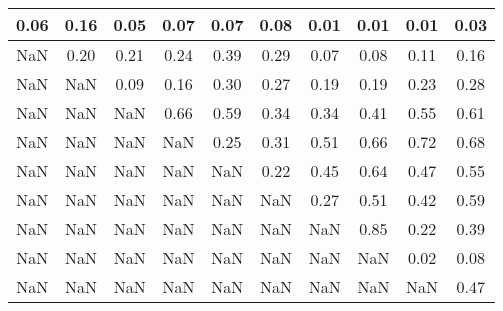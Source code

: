 \begin{tabular}{|c|c|c|c|c|c|c|c|c|c|}
\hline
0.06&0.16&0.05&0.07&0.07&0.08&0.01&0.01&0.01&0.03\\\hline
NaN&0.20&0.21&0.24&0.39&0.29&0.07&0.08&0.11&0.16\\\hline
NaN&NaN&0.09&0.16&0.30&0.27&0.19&0.19&0.23&0.28\\\hline
NaN&NaN&NaN&0.66&0.59&0.34&0.34&0.41&0.55&0.61\\\hline
NaN&NaN&NaN&NaN&0.25&0.31&0.51&0.66&0.72&0.68\\\hline
NaN&NaN&NaN&NaN&NaN&0.22&0.45&0.64&0.47&0.55\\\hline
NaN&NaN&NaN&NaN&NaN&NaN&0.27&0.51&0.42&0.59\\\hline
NaN&NaN&NaN&NaN&NaN&NaN&NaN&0.85&0.22&0.39\\\hline
NaN&NaN&NaN&NaN&NaN&NaN&NaN&NaN&0.02&0.08\\\hline
NaN&NaN&NaN&NaN&NaN&NaN&NaN&NaN&NaN&0.47\\\hline
\end{tabular}
